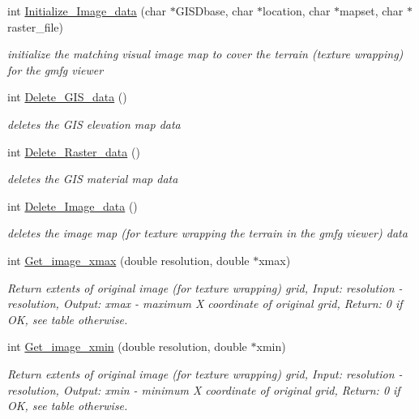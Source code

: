\begin{CompactItemize}
int \hyperlink{GisApi_8C_a35}{Initialize\_\-Image\_\-data} (char $\ast$GISDbase, char $\ast$location, char $\ast$mapset, char $\ast$raster\_\-file)
\begin{CompactList}\small\item\em initialize the matching visual image map to cover the terrain (texture wrapping) for the gmfg viewer \item\end{CompactList}\item 
int \hyperlink{GisApi_8C_a36}{Delete\_\-GIS\_\-data} ()
\begin{CompactList}\small\item\em deletes the GIS elevation map data \item\end{CompactList}\item 
int \hyperlink{GisApi_8C_a37}{Delete\_\-Raster\_\-data} ()
\begin{CompactList}\small\item\em deletes the GIS material map data \item\end{CompactList}\item 
int \hyperlink{GisApi_8C_a38}{Delete\_\-Image\_\-data} ()
\begin{CompactList}\small\item\em deletes the image map (for texture wrapping the terrain in the gmfg viewer) data \item\end{CompactList}\item 
int \hyperlink{GisApi_8C_a39}{Get\_\-image\_\-xmax} (double resolution, double $\ast$xmax)
\begin{CompactList}\small\item\em Return extents of original image (for texture wrapping) grid, Input: resolution - resolution, Output: xmax - maximum X coordinate of original grid, Return: 0 if OK, see table otherwise. \item\end{CompactList}\item 
int \hyperlink{GisApi_8C_a40}{Get\_\-image\_\-xmin} (double resolution, double $\ast$xmin)
\begin{CompactList}\small\item\em Return extents of original image (for texture wrapping) grid, Input: resolution - resolution, Output: xmin - minimum X coordinate of original grid, Return: 0 if OK, see table otherwise. \item\end{CompactList}\item 

\end{CompactItemize}
